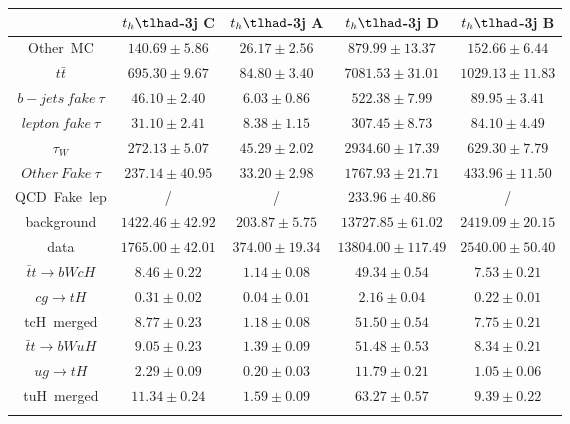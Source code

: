 \begin{tabular}{ccccc} \toprule\toprule
 & $t_{h}\tlhad$-3j C & $t_{h}\tlhad$-3j A & $t_{h}\tlhad$-3j D & $t_{h}\tlhad$-3j B\\\midrule
Other~MC & $140.69\pm5.86$ & $26.17\pm2.56$ & $879.99\pm13.37$ & $152.66\pm6.44$\\
$t\bar{t}$ & $695.30\pm9.67$ & $84.80\pm3.40$ & $7081.53\pm31.01$ & $1029.13\pm11.83$\\
$b-jets~fake~\tau$ & $46.10\pm2.40$ & $6.03\pm0.86$ & $522.38\pm7.99$ & $89.95\pm3.41$\\
$lepton~fake~\tau$ & $31.10\pm2.41$ & $8.38\pm1.15$ & $307.45\pm8.73$ & $84.10\pm4.49$\\
$\tau_{W}$ & $272.13\pm5.07$ & $45.29\pm2.02$ & $2934.60\pm17.39$ & $629.30\pm7.79$\\
$Other~Fake~\tau$ & $237.14\pm40.95$ & $33.20\pm2.98$ & $1767.93\pm21.71$ & $433.96\pm11.50$\\
QCD~Fake~lep &  / &  / & $233.96\pm40.86$ &  /\\
background & $1422.46\pm42.92$ & $203.87\pm5.75$ & $13727.85\pm61.02$ & $2419.09\pm20.15$\\
data & $1765.00\pm42.01$ & $374.00\pm19.34$ & $13804.00\pm117.49$ & $2540.00\pm50.40$\\
$\bar{t}t\to bWcH$ & $8.46\pm0.22$ & $1.14\pm0.08$ & $49.34\pm0.54$ & $7.53\pm0.21$\\
$cg\to tH$ & $0.31\pm0.02$ & $0.04\pm0.01$ & $2.16\pm0.04$ & $0.22\pm0.01$\\
tcH~merged & $8.77\pm0.23$ & $1.18\pm0.08$ & $51.50\pm0.54$ & $7.75\pm0.21$\\
$\bar{t}t\to bWuH$ & $9.05\pm0.23$ & $1.39\pm0.09$ & $51.48\pm0.53$ & $8.34\pm0.21$\\
$ug\to tH$ & $2.29\pm0.09$ & $0.20\pm0.03$ & $11.79\pm0.21$ & $1.05\pm0.06$\\
tuH~merged & $11.34\pm0.24$ & $1.59\pm0.09$ & $63.27\pm0.57$ & $9.39\pm0.22$\\
\bottomrule\bottomrule\\
\end{tabular}
